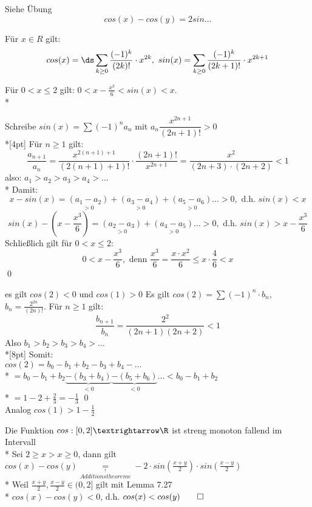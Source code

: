 Siehe Übung
$$cos(x)-cos(y)=2sin \ldots$$

Für $x \in R$ gilt:
$$cos(x) = \ds\sum_{k \geq 0} \frac{(-1)^k}{(2k)!} \cdot x^{2k},\ sin(x) =\sum_{k \geq 0} \frac{(-1)^k}{(2k +1)!} \cdot x^{2k+1} $$

Für $0<x\leq 2$ gilt: $0<x-\frac{x^3}{6}<sin(x)<x$.\\*

\bew
Schreibe $sin(x)=\sum(-1)^na_n$ mit $a_n\dfrac{x^{2n+1}}{(2n+1)!}>0$\\*[4pt]
Für $n\geq 1$ gilt: $$\frac{a_{n+1}}{a_n}=\dfrac{x^{2(n+1)+1}}{(2(n+1)+1)!}·\dfrac{(2n+1)!}{x^{2n+1}}=\frac{x^2}{(2n+3)·(2n+2)}<1$$
also: $a_1>a_2>a_3>a_4>…$\\*
Damit: $$x-sin(x)=\underset{>0}{(a_1-a_2)}+\underset{>0}{(a_3-a_4)}+\underset{>0}{(a_5-a_6)}…>0,\text{ d.h. $sin(x)<x$}$$
$$sin(x)-(x-\frac{x^3}{6})=\underset{>0}{(a_2-a_3)}+\underset{>0}{(a_4-a_5)}…>0,\text{ d.h. $sin(x)>x-\frac{x^3}{6}$}$$
Schließlich gilt für $0<x\leq 2$:
$$0<x-\frac{x^3}{6}, \text{ denn } \frac{x^3}{6}=\frac{x·x^2}{6}\leq x·\frac{4}{6}<x$$ \qed

 es gilt $cos(2) < 0$ und $cos(1) > 0$
\bew
	Es gilt $cos(2) = \sum (-1)^n \cdot b_n$, $b_n = \frac{2^{2n}}{(2n)!}$. Für $n \geq 1$ gilt: 
	$$\frac{b_{n+1}}{b_n} = \frac{2^2}{(2n+1)(2n+2)} < 1$$
	Also $b_1 > b_2 > b_3 > b_4 >…$ \\*[8pt]
	Somit:\\
	$cos(2) = b_0 - b_1 + b_2 - b_3 + b_4 - …$\\*
	$= b_0 - b_1 + b_2 \underbrace{-(b_3 + b_4)}_{<0} \underbrace{-(b_5 + b_6)}_{< 0}… < b_0 - b_1 + b_2$ \\*
	$= 1 - 2 + \frac{2}{3} = - \frac{1}{3}$ \qed\\
	Analog $cos(1) > 1-\frac{1}{2}$

Die Funktion $cos:[0,2]→\R$ ist streng monoton fallend im Intervall\\*
\bew
Sei $2\geq x>x\geq 0$, dann gilt $cos(x)-cos(y)\underset{\overset{\uparrow}{Additionstheoreme}}{=}-2·sin(\frac{x+y}{2})·sin(\frac{x-y}{2})$\\*
Weil $\frac{x+y}{2}, \frac{x-y}{2}\in (0,2]$ gilt mit Lemma 7.27\\*
$cos(x)-cos(y)<0$, d.h. $cos(x)<cos(y)\qed$

